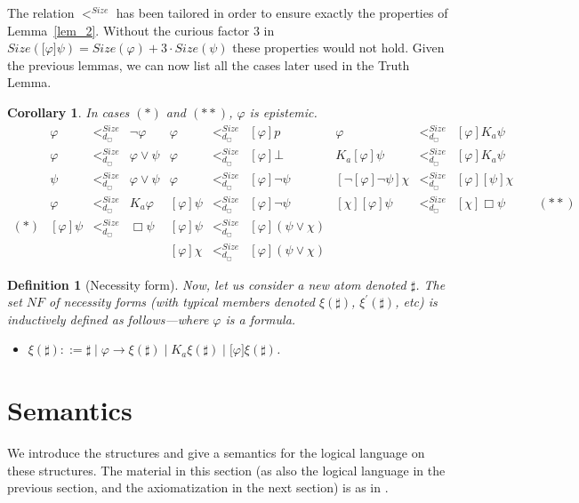 \documentclass{article}[12pt]
\newtheorem{corollary}{Corollary}
\newtheorem{definition}{Definition}
\renewcommand{\phi}{\varphi}
\begin{document}
The relation $<^{Size}$ has been tailored in order to ensure exactly the properties of Lemma~\ref{lem_2}.
Without the curious factor $3$ in $Size(\lbrack\phi\rbrack\psi)=Size(\phi)+3 \cdot Size(\psi)$ these properties would not hold.
Given the previous lemmas, we can now list all the cases later used in the Truth Lemma.
\begin{corollary} In cases $(*)$ and $(**)$, $\phi$ is epistemic.
\[ \begin{array}{llll|lll|lll}
&\phi &<_{d_{\Box}}^{Size}& \neg\phi &        \phi &<_{d_{\Box}}^{Size}& [\phi]p               & \phi &<_{d_{\Box}}^{Size}& [\phi]K_{a}\psi \\
&\phi &<_{d_{\Box}}^{Size}& \phi\vee\psi &    \phi &<_{d_{\Box}}^{Size}& [\phi]\bot                   & K_{a} [\phi]\psi &<_{d_{\Box}}^{Size}& [\phi] K_{a} \psi \\
&\psi &<_{d_{\Box}}^{Size}& \phi\vee\psi &    \phi &<_{d_{\Box}}^{Size}& [\phi]\neg\psi             & [\neg [\phi]\neg \psi]\chi &<_{d_{\Box}}^{Size}& [\phi][\psi]\chi \\
&\phi &<_{d_{\Box}}^{Size}& K_{a}\phi &    [\phi]\psi &<_{d_{\Box}}^{Size}& [\phi]\neg\psi       & [\chi][\phi]\psi &<_{d_{\Box}}^{Size}& [\chi]\Box \psi \ \hspace{1cm} (**) \\
(*)&[\phi]\psi &<_{d_{\Box}}^{Size}& \Box\psi & [\phi]\psi &<_{d_{\Box}}^{Size}& [\phi](\psi\vee\chi) & \\
 & &&&                      [\phi]\chi &<_{d_{\Box}}^{Size}& [\phi](\psi\vee\chi) & 
\end{array} \]
\end{corollary}
\begin{definition}[Necessity form]
Now, let us consider a new atom denoted $\sharp$.
The set $NF$ of {\em necessity forms} (with typical members denoted $\xi(\sharp)$, $\xi^{\prime}(\sharp)$, etc) is inductively defined as follows---where $\phi$ is a formula.
\begin{itemize}
\item $\xi(\sharp)::=\sharp\mid\phi\rightarrow\xi(\sharp)\mid K_{a}\xi(\sharp)\mid\lbrack\phi\rbrack\xi(\sharp)$.
\end{itemize}
\end{definition}
\section{Semantics}


We introduce the structures and give a semantics for the logical language on these structures. The material in this section (as also the logical language in the previous section, and the axiomatization in the next section) is as in \cite{balbianietal:2008}.
\end{document}
